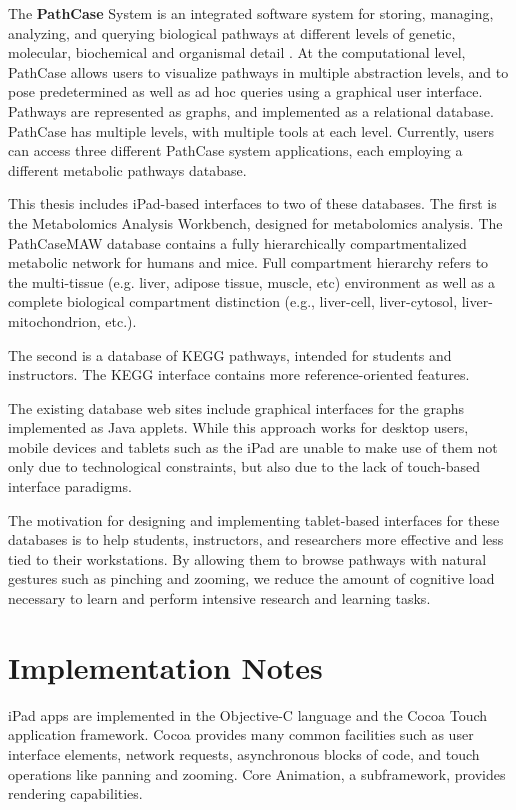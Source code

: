 The \textbf{PathCase} System is an integrated software system for storing,
managing, analyzing, and querying biological pathways at different levels of
genetic, molecular, biochemical and organismal detail \cite{pathcase-basic}. At
the computational level, PathCase allows users to visualize pathways in multiple
abstraction levels, and to pose predetermined as well as ad hoc queries using a
graphical user interface. Pathways are represented as graphs, and implemented as
a relational database. PathCase has multiple levels, with multiple tools at each
level. Currently, users can access three different PathCase system applications,
each employing a different metabolic pathways database.

This thesis includes iPad-based interfaces to two of these databases. The first
is the Metabolomics Analysis Workbench, designed for metabolomics analysis. The
PathCaseMAW database contains a fully hierarchically compartmentalized metabolic
network for humans and mice. Full compartment hierarchy refers to the
multi-tissue (e.g. liver, adipose tissue, muscle, etc) environment as well as a
complete biological compartment distinction (e.g., liver-cell, liver-cytosol,
liver-mitochondrion, etc.).

The second is a database of KEGG pathways, intended for students and
instructors. The KEGG interface contains more reference-oriented features.

The existing database web sites include graphical interfaces for the graphs
implemented as Java applets. While this approach works for desktop users, mobile
devices and tablets such as the iPad are unable to make use of them not only due
to technological constraints, but also due to the lack of touch-based interface
paradigms.

The motivation for designing and implementing tablet-based interfaces for these
databases is to help students, instructors, and researchers more effective and
less tied to their workstations. By allowing them to browse pathways with
natural gestures such as pinching and zooming, we reduce the amount of cognitive
load necessary to learn and perform intensive research and learning tasks.

\section{Implementation Notes}
\label{sect:implementation_notes}

iPad apps are implemented in the Objective-C language and the Cocoa Touch
application framework.  Cocoa provides many common facilities such as user
interface elements, network requests, asynchronous blocks of code, and touch
operations like panning and zooming. Core Animation, a subframework, provides
rendering capabilities.

